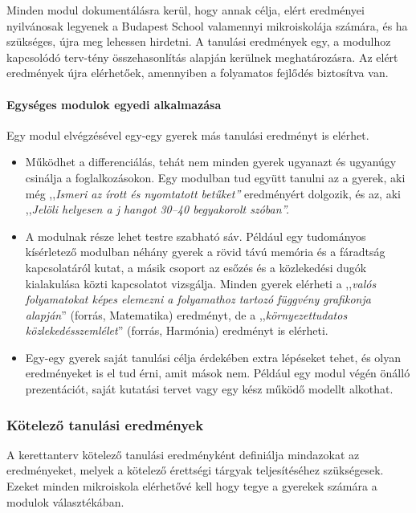 Minden modul dokumentálásra\linebreak
kerül, hogy annak célja, elért eredményei nyilvánosak legyenek a Budapest School valamennyi mikroiskolája számára, és ha szükséges, újra meg lehessen hirdetni. A tanulási eredmények egy, a modulhoz kapcsolódó terv-tény összehasonlítás alapján kerülnek meghatározásra. Az elért eredmények újra elérhetőek, amennyiben a folyamatos fejlődés biztosítva van.

\paragraph{Egységes modulok egyedi alkalmazása}

Egy modul elvégzésével egy-egy\linebreak
gyerek más tanulási eredményt is elérhet.

\begin{itemize}
      \item
            Működhet a differenciálás, tehát nem minden gyerek ugyanazt és ugyanúgy csinálja a foglalkozásokon. Egy modulban tud együtt	tanulni az a gyerek, aki még ,,\emph{Ismeri az írott és nyomtatott  betűket''} eredményért dolgozik, és az, aki ,,\emph{Jelöli helyesen a j	hangot 30--40 begyakorolt szóban''.}
      \item
            A modulnak része lehet testre szabható sáv. Például egy
            tudományos kísérletező modulban néhány gyerek a rövid távú
            memória és a	fáradtság kapcsolatáról kutat, a másik
            csoport az esőzés és a	közlekedési dugók kialakulása
            közti kapcsolatot vizsgálja. Minden  gyerek elérheti a
            ,,\emph{valós folyamatokat képes elemezni a folyamathoz
              tartozó függvény grafikonja alapján}''  (forrás,
            Matematika) eredményt, de a ,,\emph{környezettudatos
              közlekedésszemlélet}'' (forrás, Harmónia)\linebreak
            eredményt is elérheti.
      \item
            Egy-egy gyerek saját tanulási célja érdekében extra lépéseket tehet, és olyan eredményeket is el tud érni, amit mások nem.	Például egy modul végén önálló prezentációt, saját kutatási  tervet vagy egy kész működő modellt alkothat.
\end{itemize}

\subsubsection{Kötelező tanulási eredmények}
\label{sec:kotelezo_tanulasi_eredmenyek}
A kerettanterv kötelező tanulási eredményként definiálja mindazokat az eredményeket, melyek a kötelező érettségi tárgyak teljesítéséhez szükségesek. Ezeket minden mikroiskola elérhetővé kell hogy tegye a gyerekek számára a modulok választékában.

